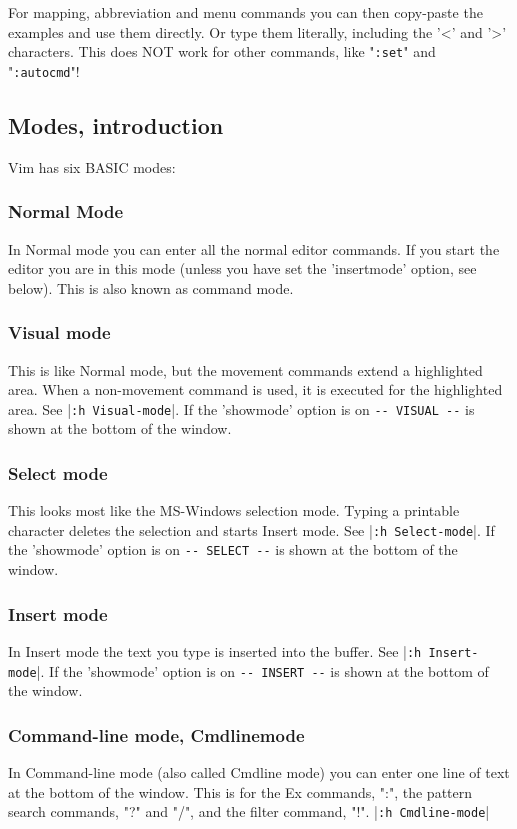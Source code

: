 For mapping, abbreviation and menu commands you can then copy-paste the examples and use them directly.
Or type them literally, including the '<' and '>' characters.
This does NOT work for other commands, like "\verb!:set!" and "\verb!:autocmd!"!

\subsection{Modes, introduction}
\label{vim-modes-intro}
\label{vim-modes}
Vim has six BASIC modes:

\subsubsection{Normal Mode}
\label{Normal}
\label{Normal-mode}
\label{command-mode}
In Normal mode you can enter all the normal editor commands.
If you start the editor you are in this mode (unless you have set the 'insertmode' option, see below).
This is also known as command mode.

\subsubsection{Visual mode}
This is like Normal mode, but the movement commands extend a highlighted area.
When a non-movement command is used, it is executed for the highlighted area.
See |\verb!:h Visual-mode!|.
If the 'showmode' option is on \verb!-- VISUAL --! is shown
at the bottom of the window.

\subsubsection{Select mode}
This looks most like the MS-Windows selection mode.
Typing a printable character deletes the selection and starts Insert mode.
See |\verb!:h Select-mode!|.
If the 'showmode' option is on \verb!-- SELECT --! is shown at the bottom of the window.

\subsubsection{Insert mode}
In Insert mode the text you type is inserted into the buffer.
See |\verb!:h Insert-mode!|.
If the 'showmode' option is on \verb!-- INSERT --! is shown at the bottom of the window.

\subsubsection{Command-line mode, Cmdlinemode}
In Command-line mode (also called Cmdline mode) you can enter one line of text at the bottom of the window.
This is for the Ex commands, ":", the pattern search commands, "?" and "/", and the filter command, "!".
|\verb!:h Cmdline-mode!|

